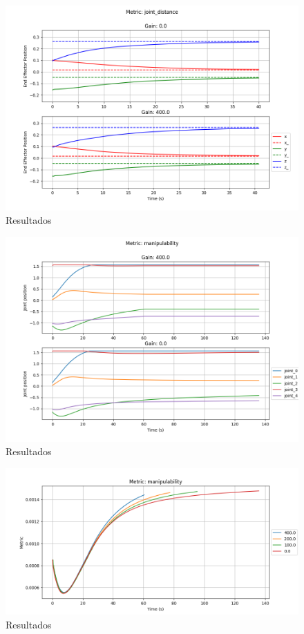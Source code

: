 \begin{figure}
    \centering
    \includegraphics[width=1.0\textwidth]{Images/joint_distance/position_joint_distance.png}
    \caption{Resultados}\label{fig:jd-p}
\end{figure}

\begin{figure}
    \centering
    \includegraphics[width=1.0\textwidth]{Images/manipulability/joint_states_manipulability.png}
    \caption{Resultados}\label{fig:m-js}
\end{figure}

\begin{figure}
    \centering
    \includegraphics[width=1.0\textwidth]{Images/manipulability/metric_manipulability.png}
    \caption{Resultados}\label{fig:m-m}
\end{figure}

